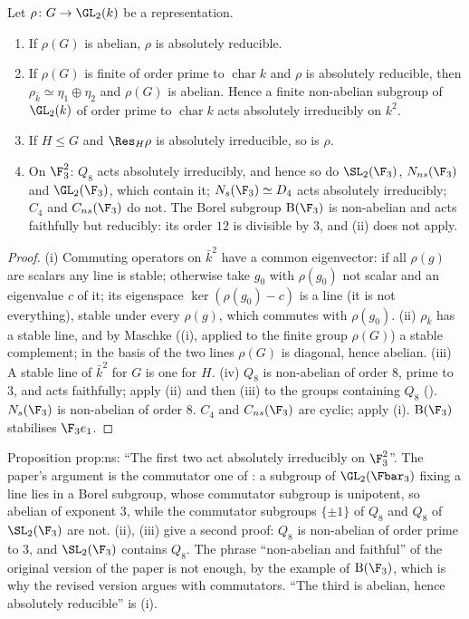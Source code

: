 \begin{proposition}\label{prop:reps:dim2-absirr}
Let $\rho\colon G\to\GL_2(k)$ be a representation.
\begin{enumerate}[label=(\roman*)]
\item If $\rho(G)$ is abelian, $\rho$ is absolutely reducible.
\item If $\rho(G)$ is finite of order prime to $\operatorname{char}k$ and $\rho$ is absolutely reducible, then $\rho_{\bar k}\simeq\eta_1\oplus\eta_2$ and $\rho(G)$
is abelian. Hence a finite non-abelian subgroup of $\GL_2(k)$ of order prime to $\operatorname{char}k$ acts absolutely irreducibly on $k^2$.
\item If $H\le G$ and $\Res_H\rho$ is absolutely irreducible, so is $\rho$.
\item On $\F_3^2$: $Q_8$ acts absolutely irreducibly, and hence so do $\SL_2(\F_3)$, $N_{ns}(\F_3)$ and $\GL_2(\F_3)$, which contain it; $N_s(\F_3)\simeq D_4$
acts absolutely irreducibly; $C_4$ and $C_{ns}(\F_3)$ do not. The Borel subgroup $\mathrm B(\F_3)$ is non-abelian and acts faithfully but
reducibly: its order $12$ is divisible by $3$, and (ii) does not apply.
\end{enumerate}
\end{proposition}

\begin{proof}
(i) Commuting operators on $\bar k^2$ have a common eigenvector: if all $\rho(g)$ are scalars any line is stable; otherwise take $g_0$
with $\rho(g_0)$ not scalar and an eigenvalue $c$ of it; its eigenspace $\ker(\rho(g_0)-c)$ is a line (it is not everything), stable under
every $\rho(g)$, which commutes with $\rho(g_0)$.
(ii) $\rho_{\bar k}$ has a stable line, and by Maschke ((i), applied to the finite group $\rho(G)$) a stable
complement; in the basis of the two lines $\rho(G)$ is diagonal, hence abelian.
(iii) A stable line of $\bar k^2$ for $G$ is one for $H$.
(iv) $Q_8$ is non-abelian of order $8$, prime to $3$, and acts faithfully; apply (ii) and then (iii) to the groups containing $Q_8$
(). $N_s(\F_3)$ is non-abelian of order $8$. $C_4$ and $C_{ns}(\F_3)$ are cyclic; apply (i). $\mathrm B(\F_3)$ stabilises $\F_3e_1$.
\end{proof}

\begin{paperlink}
Proposition prop:ns: ``The first two act absolutely irreducibly on $\F_3^2$''. The paper's argument is the commutator one of
: a subgroup of $\GL_2(\Fbar_3)$ fixing a line lies in a Borel subgroup, whose commutator subgroup is unipotent, so abelian
of exponent $3$, while the commutator subgroups $\{\pm1\}$ of $Q_8$ and $Q_8$ of $\SL_2(\F_3)$ are not. (ii), (iii) give
a second proof: $Q_8$ is non-abelian of order prime to $3$, and $\SL_2(\F_3)$ contains $Q_8$. The phrase ``non-abelian and faithful'' of
the original version of the paper is not enough, by the example of $\mathrm B(\F_3)$, which is why the revised version argues with commutators. ``The third is abelian,
hence absolutely reducible'' is (i).
\end{paperlink}

